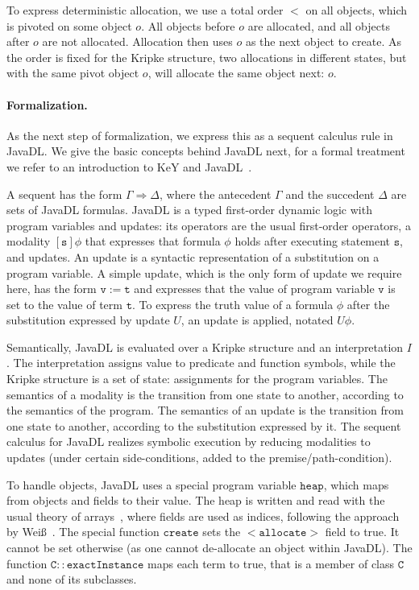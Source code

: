 To express deterministic allocation, we use a total order $<$ on all objects, which is pivoted on some object $o$.
All objects before $o$ are allocated, and all objects after $o$ are not allocated.
Allocation then uses $o$ as the next object to create. 
As the order is fixed for the Kripke structure, two allocations in different states, but with the same pivot object $o$, will allocate the same object next: $o$.

\paragraph{Formalization.}
As the next step of formalization, we express this as a sequent calculus rule in JavaDL.
We give the basic concepts behind JavaDL next, 
for a formal treatment we refer to an introduction to KeY and JavaDL~\cite{DBLP:series/lncs/10001}.

A sequent has the form $\Gamma \Rightarrow \Delta$, where the antecedent $\Gamma$ and the succedent $\Delta$ are sets of JavaDL formulas.
JavaDL is a typed first-order dynamic logic with program variables and updates: its operators are the usual first-order operators, a modality $[\mathtt{s}]\phi$
that expresses that formula $\phi$ holds after executing statement $\mathtt{s}$, and updates.
An update is a syntactic representation of a substitution on a program variable. A simple update, which is the only form of update we require here, 
has the form $\mathtt{v} := \mathtt{t}$ and expresses that the value of program variable $\mathtt{v}$ is set to the value of term $\mathtt{t}$.
To express the truth value of a formula $\phi$ after the substitution expressed by update $U$, an update is applied, notated ${U}\phi$.

Semantically, JavaDL is evaluated over a Kripke structure and an interpretation $I$. The interpretation assigns value to predicate and function symbols, 
while the Kripke structure is a set of state: assignments for the program variables. The semantics of a modality is the transition from one state to another,
according to the semantics of the program. The semantics of an update is the transition from one state to another, according to the substitution expressed by it.
The sequent calculus for JavaDL realizes symbolic execution by reducing modalities to updates (under certain side-conditions, added to the premise/path-condition).

To handle objects, JavaDL uses a special program variable $\mathtt{heap}$, which maps from objects and fields to their value.
The heap is written and read with the usual theory of arrays~\cite{DBLP:conf/ifip/McCarthy62}, where fields are used as indices, following the approach by Wei\ss~\cite{DBLP:phd/dnb/Weiss11}.
The special function $\mathtt{create}$ sets the $\mathtt{<allocate>}$ field to true. It cannot be set otherwise (as one cannot de-allocate an object within JavaDL).
The function $\mathtt{C\!::\!exactInstance}$ maps each term to true, that is a member of class $\mathtt{C}$ and none of its subclasses.  

